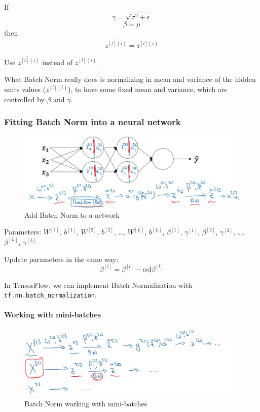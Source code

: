 \documentclass[UTF8]{article}
\newcommand{\Vector}[1]{\boldsymbol{\mathit{#1}}}   %
\newcommand{\Matrix}[1]{\boldsymbol{\mathit{#1}}}   %
\begin{document}
If
$$ \gamma = \sqrt{\sigma^2 + \epsilon} $$
$$ \beta = \mu $$
then
$$ \widetilde{z^{[l](i)}} = z^{[l](i)} $$

Use $\widetilde{z^{[l](i)}}$ instead of $z^{[l](i)}$.

What Batch Norm really does is normalizing in mean and variance of the hidden units values
($z^{[l](i)}$), to have some fixed mean and variance, which are controlled by $\beta$ and $\gamma$.

\subsubsection{Fitting Batch Norm into a neural network}
\begin{figure}[htb]
    \centering
    \includegraphics[width=40em]{figures/add-batch-norm-to-a-network}
    \caption{Add Batch Norm to a network}
    \label{fig:add-batch-norm-to-a-network}
\end{figure}

Parameters: $\Matrix{W^{[1]}}$, $\Vector{b^{[1]}}$, $\Matrix{W^{[2]}}$, $\Vector{b^{[2]}}$, \ldots,
$\Matrix{W^{[L]}}$, $\Vector{b^{[L]}}$, \quad
$\beta^{[1]}$, $\gamma^{[1]}$, $\beta^{[2]}$, $\gamma^{[2]}$, \ldots, $\beta^{[L]}$, $\gamma^{[L]}$

Update parameters in the same way:
$$ \beta^{[l]} = \beta^{[l]} - \alpha \text{d}\beta^{[l]} $$

In TensorFlow, we can implement Batch Normalization with
\texttt{tf.nn.batch_normalization}.

\paragraph{Working with mini-batches}
\begin{figure}[htb]
    \centering
    \includegraphics[width=40em]{figures/batch-norm-with-mini-batches}
    \caption{Batch Norm working with mini-batches}
    \label{fig:batch-norm-with-mini-batches}
\end{figure}
\end{document}
